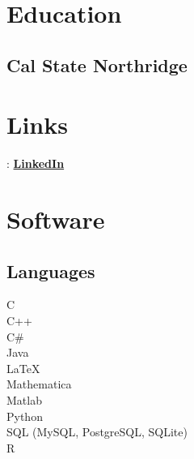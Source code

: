 \documentclass[letterpaper]{clinton-resume}
\begin{document}
\lastupdated
{}
\begin{minipage}[t]{0.33\textwidth}
\section{Education} 

\subsection{Cal State Northridge}


\sectionspace %


\sectionspace

\section{Links} 
\faLinkedinSign: \href{https://www.linkedin.com/pub/clinton-bowen/20/161/91?trk=pub-pbmap}{\bf LinkedIn} \\

\section{Software}
\subsection{Languages}
C\\
C++\\
C\#\\
Java\\
\LaTeX\\
Mathematica\\
Matlab\\
Python\\
SQL (MySQL, PostgreSQL, SQLite)\\
R\\


\end{minipage}
\end{document}
